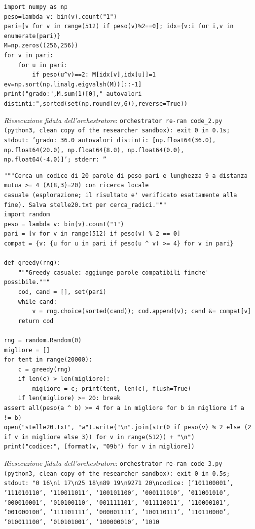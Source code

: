 \documentclass[11pt,a4paper]{article}
\begin{document}
\begin{lstlisting}[caption={attempt\_001 code\_2 [python, rigore float\_exploration\_only] — Numerical sanity check (float eigenvalues, NOT a proof) of Step 2: the distance-2 graph on — verdetto del Referee: REJECT}]
import numpy as np
peso=lambda v: bin(v).count("1")
pari=[v for v in range(512) if peso(v)%2==0]; idx={v:i for i,v in enumerate(pari)}
M=np.zeros((256,256))
for v in pari:
    for u in pari:
        if peso(u^v)==2: M[idx[v],idx[u]]=1
ev=np.sort(np.linalg.eigvalsh(M))[::-1]
print("grado:",M.sum(1)[0]," autovalori distinti:",sorted(set(np.round(ev,6)),reverse=True))

\end{lstlisting}
\noindent\emph{Riesecuzione fidata dell'orchestratore}: \texttt{orchestrator re-ran code\_2.py (python3, clean copy of the researcher sandbox): exit 0 in 0.1s; stdout: 'grado: 36.0  autovalori distinti: [np.float64(36.0), np.float64(20.0), np.float64(8.0), np.float64(0.0), np.float64(-4.0)]'; stderr: ''}
\begin{lstlisting}[caption={attempt\_001 code\_3 [python, rigore exact] — Builds a 20-word even-weight code of length 9 with pairwise distance \textgreater{}= 4 by randomised gr — verdetto del Referee: REJECT}]
"""Cerca un codice di 20 parole di peso pari e lunghezza 9 a distanza mutua >= 4 (A(8,3)=20) con ricerca locale
casuale (esplorazione; il risultato e' verificato esattamente alla fine). Salva stelle20.txt per cerca_radici."""
import random
peso = lambda v: bin(v).count("1")
pari = [v for v in range(512) if peso(v) % 2 == 0]
compat = {v: {u for u in pari if peso(u ^ v) >= 4} for v in pari}

def greedy(rng):
    """Greedy casuale: aggiunge parole compatibili finche' possibile."""
    cod, cand = [], set(pari)
    while cand:
        v = rng.choice(sorted(cand)); cod.append(v); cand &= compat[v]
    return cod

rng = random.Random(0)
migliore = []
for tent in range(20000):
    c = greedy(rng)
    if len(c) > len(migliore):
        migliore = c; print(tent, len(c), flush=True)
    if len(migliore) >= 20: break
assert all(peso(a ^ b) >= 4 for a in migliore for b in migliore if a != b)
open("stelle20.txt", "w").write("\n".join(str(0 if peso(v) % 2 else (2 if v in migliore else 3)) for v in range(512)) + "\n")
print("codice:", [format(v, "09b") for v in migliore])

\end{lstlisting}
\noindent\emph{Riesecuzione fidata dell'orchestratore}: \texttt{orchestrator re-ran code\_3.py (python3, clean copy of the researcher sandbox): exit 0 in 0.5s; stdout: "0 16\textbackslash{}n1 17\textbackslash{}n25 18\textbackslash{}n89 19\textbackslash{}n9271 20\textbackslash{}ncodice: ['101100001', '111010110', '110011011', '100101100', '000111010', '011001010', '000010001', '010100110', '001111101', '011110011', '110000101', '001000100', '111101111', '000001111', '100110111', '110110000', '010011100', '010101001', '100000010', '1010}
\end{document}
